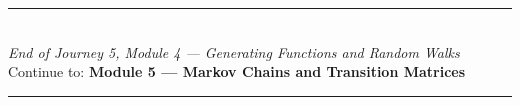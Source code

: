 \documentclass[12pt, a4paper]{article}
\begin{document}
\vspace{1.4cm}
\begin{center}
{\color{MidBlue}\rule{0.5\linewidth}{0.8pt}}\\[6pt]
{\small\color{DarkGrey}\textit{End of Journey 5, Module 4 --- Generating Functions and Random Walks}}\\[4pt]
{\small\color{DarkGrey}Continue to: \textbf{Module 5 --- Markov Chains and Transition Matrices}}\\[6pt]
{\color{MidBlue}\rule{0.5\linewidth}{0.8pt}}
\end{center}
\end{document}

